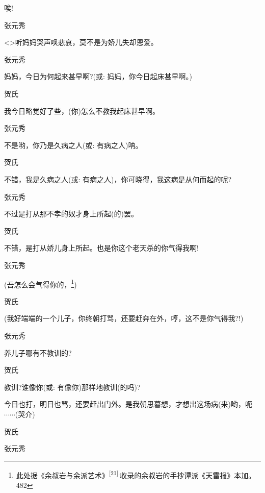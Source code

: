 唉!

张元秀

\textless{}\!\textgreater{}听妈妈哭声唤悲哀，莫不是为娇儿失却恩爱。

张元秀\hspace{20pt}~

妈妈，今日为何起来甚早啊?({\akai 或}: 妈妈，你今日起床甚早啊。)

贺氏\hspace{30pt}~

我今日略觉好了些，(你)怎么不教我起床甚早啊。

张元秀\hspace{20pt}~

不是哟，你乃是久病之人({\akai 或}: 有病之人)呐。

贺氏\hspace{30pt}~

不错，我是久病之人({\akai 或}: 有病之人)，你可晓得，我这病是从何而起的呢?

张元秀\hspace{20pt}~

不过是打从那不孝的奴才身上所起(的)罢。

贺氏\hspace{30pt}~

不错，是打从娇儿身上所起。也是你这个老天杀的你气得我啊!

张元秀

(吾怎么会气得你的，\footnote{ 此处据《余叔岩与余派艺术》\textsuperscript{{[}21{]}.}收录的余叔岩的手抄谭派《天雷报》本加。{482}})

贺氏

(我好端端的一个儿子，你终朝打骂，还要赶奔在外，哼，这不是你气得我?!)

张元秀\hspace{20pt}~

养儿子哪有不教训的?

贺氏\hspace{30pt}~

教训?谁像你({\akai 或}: 有像你)那样地教训(的吗)?

今日也打，明日也骂，还要赶出门外。是我朝思暮想，才想出这场病(来)哟，呃$\cdots{}\cdots{}$(哭介)

贺氏


张元秀

